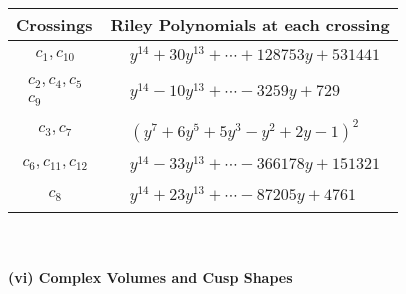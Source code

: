 \documentclass[1p]{elsarticle_modified}
\theoremstyle{definition}
\begin{document}
\begin{tabular}{m{50pt}|m{274pt}}
Crossings & \hspace{64pt}Riley Polynomials at each crossing \\
\hline $$\begin{aligned}c_{1},c_{10}\end{aligned}$$&$\begin{aligned}
&y^{14}+30 y^{13}+\cdots+128753 y+531441
\end{aligned}$\\
\hline $$\begin{aligned}c_{2},c_{4},c_{5}\\c_{9}\end{aligned}$$&$\begin{aligned}
&y^{14}-10 y^{13}+\cdots-3259 y+729
\end{aligned}$\\
\hline $$\begin{aligned}c_{3},c_{7}\end{aligned}$$&$\begin{aligned}
&(y^7+6 y^5+5 y^3- y^2+2 y-1)^2
\end{aligned}$\\
\hline $$\begin{aligned}c_{6},c_{11},c_{12}\end{aligned}$$&$\begin{aligned}
&y^{14}-33 y^{13}+\cdots-366178 y+151321
\end{aligned}$\\
\hline $$\begin{aligned}c_{8}\end{aligned}$$&$\begin{aligned}
&y^{14}+23 y^{13}+\cdots-87205 y+4761
\end{aligned}$\\
\hline
\end{tabular}\\~\\
\newpage\flushleft \textbf{(vi) Complex Volumes and Cusp Shapes}
\end{document}
